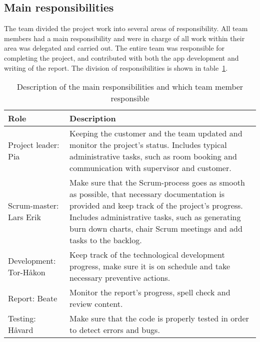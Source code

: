 \subsection{Main responsibilities}
\label{sec:mainresp}
The team divided the project work into several areas of responsibility. All team members had a main responsibility and were in charge of all work within their area was delegated and carried out. The entire team was responsible for completing the project, and contributed with both the app development and writing of the report. The division of responsibilities is shown in table~\ref{tab:mainResponsibilities}.


\begin{table}[H]
\centering
{}
\begin{tabular}{|l|p{11.2cm}|}
\hline
\textbf{Role} & \textbf{Description}\\\hline
Project leader: Pia & Keeping the customer and the team updated and monitor the project's status. Includes typical administrative tasks, such as room booking and communication with supervisor and customer.\\\hline
Scrum-master: Lars Erik & Make sure that the Scrum-process goes as smooth as possible, that necessary documentation is provided and keep track of the project's progress. Includes administrative tasks, such as generating burn down charts, chair Scrum meetings and add tasks to the backlog.\\\hline
Development: Tor-Håkon & Keep track of the technological development progress, make sure it is on schedule and take necessary preventive actions.\\\hline
Report: Beate & Monitor the report's progress, spell check and review content.\\\hline
Testing: Håvard & Make sure that the code is properly tested in order to detect errors and bugs. \\\hline
\end{tabular}
\caption{Description of the main responsibilities and which team member responsible}
\label{tab:mainResponsibilities}
\end{table}

